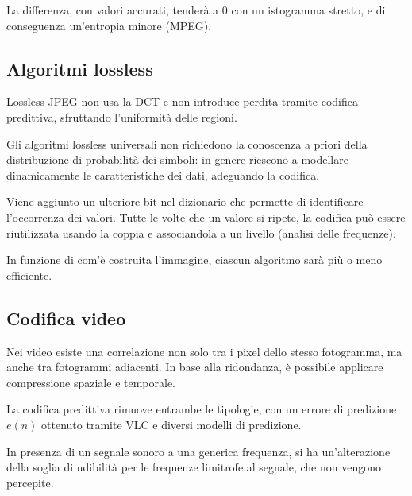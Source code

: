 La differenza, con valori accurati, tenderà a 0 con un istogramma stretto, e di conseguenza un'entropia minore (MPEG). 

\subsection{Algoritmi lossless}
Lossless JPEG non usa la DCT e non introduce perdita tramite codifica predittiva, sfruttando l'uniformità delle regioni.

Gli algoritmi lossless universali non richiedono la conoscenza a priori della distribuzione di probabilità dei simboli: in genere riescono a modellare dinamicamente le caratteristiche dei dati, adeguando la codifica.

Viene aggiunto un ulteriore bit nel dizionario che permette di identificare l'occorrenza dei valori. Tutte le volte che un valore si ripete, la codifica può essere riutilizzata usando la coppia e associandola a un livello (analisi delle frequenze). 

In funzione di com'è costruita l'immagine, ciascun algoritmo sarà più o meno efficiente. 

\subsection{Codifica video}
Nei video esiste una correlazione non solo tra i pixel dello stesso fotogramma, ma anche tra fotogrammi adiacenti. In base alla ridondanza, è possibile applicare compressione spaziale e temporale.

La codifica predittiva rimuove entrambe le tipologie, con un errore di predizione $e(n)$ ottenuto tramite VLC e diversi modelli di predizione. %

In presenza di un segnale sonoro a una generica frequenza, si ha un'alterazione della soglia di udibilità per le frequenze limitrofe al segnale, che non vengono percepite. 



